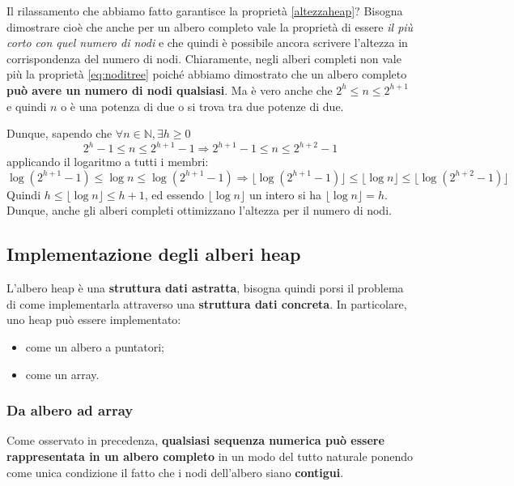 Il rilassamento che abbiamo fatto garantisce la proprietà \ref{altezzaheap}? Bisogna dimostrare cioè che anche per un albero completo vale la proprietà di essere \textit{il più corto con quel numero di nodi} e che quindi è possibile ancora scrivere l'altezza in corrispondenza del numero di nodi. Chiaramente, negli alberi completi non vale più la proprietà  \ref{eq:noditree} poiché abbiamo dimostrato che un albero completo \textbf{può avere un numero di nodi qualsiasi}. Ma è vero anche che $2^{h}\leq n \leq 2^{h+1}$ e quindi $n$ o è una potenza di due o si trova tra due potenze di due.

Dunque, sapendo che $\forall n \in \mathbb{N}, \exists h \geq 0$
\begin{displaymath}
	2^{h}-1 \leq n \leq 2^{h+1}-1 \Rightarrow 2^{h+1}-1 \leq n \leq 2^{h+2}-1
\end{displaymath}
applicando il logaritmo a tutti i membri:
\begin{displaymath}
	\log(2^{h+1}-1) \leq \log n \leq \log(2^{h+1}-1) \Rightarrow \lfloor \log(2^{h+1}-1)\rfloor \leq {\lfloor \log n \rfloor} \leq {\lfloor \log(2^{h+2}-1) \rfloor}
\end{displaymath}
Quindi $h \leq \lfloor \log n \rfloor \leq h+1$, ed essendo $\lfloor \log n \rfloor$ un intero si ha $\lfloor \log n \rfloor = h$. Dunque, anche gli alberi completi ottimizzano l'altezza per il numero di nodi.

\subsection{Implementazione degli alberi heap}
L'albero heap è una \textbf{struttura dati astratta}, bisogna quindi porsi il problema di come implementarla attraverso una \textbf{struttura dati concreta}. In particolare, uno heap può essere implementato:
\begin{itemize}
	\item come un albero a puntatori;
	\item come un array.
\end{itemize}

\subsubsection{Da albero ad array}
Come osservato in precedenza, \textbf{qualsiasi sequenza numerica può essere rappresentata in un albero completo} in un modo del tutto naturale ponendo come unica condizione il fatto che i nodi dell'albero siano \textbf{contigui}.


